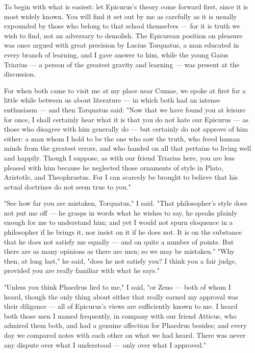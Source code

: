  To begin with what is easiest: let Epicurus's theory come forward first, since it is most widely known. You will find it set out by me as carefully as it is usually expounded by those who belong to that school themselves — for it is truth we wish to find, not an adversary to demolish. The Epicurean position on pleasure was once argued with great precision by Lucius Torquatus, a man educated in every branch of learning, and I gave answer to him, while the young Gaius Triarius — a person of the greatest gravity and learning — was present at the discussion.

 For when both came to visit me at my place near Cumae, we spoke at first for a little while between us about literature — in which both had an intense enthusiasm — and then Torquatus said: "Now that we have found you at leisure for once, I shall certainly hear what it is that you do not hate our Epicurus — as those who disagree with him generally do — but certainly do not approve of him either: a man whom I hold to be the one who saw the truth, who freed human minds from the greatest errors, and who handed on all that pertains to living well and happily. Though I suppose, as with our friend Triarius here, you are less pleased with him because he neglected those ornaments of style in Plato, Aristotle, and Theophrastus. For I can scarcely be brought to believe that his actual doctrines do not seem true to you."

 "See how far you are mistaken, Torquatus," I said. "That philosopher's style does not put me off — he grasps in words what he wishes to say, he speaks plainly enough for me to understand him; and yet I would not spurn eloquence in a philosopher if he brings it, nor insist on it if he does not. It is on the substance that he does not satisfy me equally — and on quite a number of points. But there are as many opinions as there are men; so we may be mistaken." "Why then, at long last," he said, "does he not satisfy you? I think you a fair judge, provided you are really familiar with what he says."

 "Unless you think Phaedrus lied to me," I said, "or Zeno — both of whom I heard, though the only thing about either that really earned my approval was their diligence — all of Epicurus's views are sufficiently known to me. I heard both those men I named frequently, in company with our friend Atticus, who admired them both, and had a genuine affection for Phaedrus besides; and every day we compared notes with each other on what we had heard. There was never any dispute over what I understood — only over what I approved."

